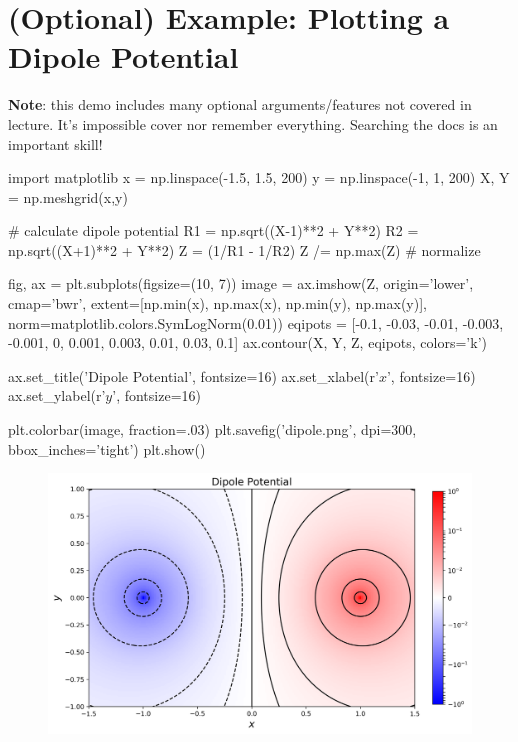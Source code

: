 \documentclass[12pt]{article}
\numberwithin{equation}{section}
\begin{document}
\section{(Optional) Example: Plotting a Dipole Potential}
\textbf{Note}: this demo includes many optional arguments/features not covered in lecture. It's impossible cover nor remember everything. Searching the docs is an important skill!

\begin{python}
import matplotlib
x = np.linspace(-1.5, 1.5, 200)
y = np.linspace(-1, 1, 200)
X, Y = np.meshgrid(x,y)

# calculate dipole potential
R1 = np.sqrt((X-1)**2 + Y**2)
R2 = np.sqrt((X+1)**2 + Y**2)
Z = (1/R1 - 1/R2)
Z /= np.max(Z) # normalize

fig, ax = plt.subplots(figsize=(10, 7))
image = ax.imshow(Z, origin='lower', cmap='bwr',
                  extent=[np.min(x), np.max(x), np.min(y), np.max(y)],
                  norm=matplotlib.colors.SymLogNorm(0.01))
eqipots = [-0.1, -0.03, -0.01, -0.003, -0.001, 0, 
           0.001, 0.003, 0.01, 0.03, 0.1]
ax.contour(X, Y, Z, eqipots, colors='k')

ax.set_title('Dipole Potential', fontsize=16)
ax.set_xlabel(r'$x$', fontsize=16)
ax.set_ylabel(r'$y$', fontsize=16)

plt.colorbar(image, fraction=.03)
plt.savefig('dipole.png', dpi=300, bbox_inches='tight')
plt.show()
\end{python}

\begin{figure}[H]
    \centering
    \includegraphics[width=16cm] {dipole}
\end{figure}
\end{document}
